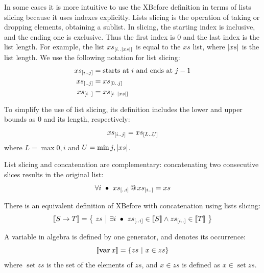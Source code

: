 \documentclass[12pt,openright,twoside,a4paper,oldfontcommands,english,brazil,final]{abntex2}
\makeatletter
\theoremstyle{theo}
\newcommand{\sliceright}[2]{\ensuremath #1_{\left[..#2\right]}}
\newcommand{\sliceleft}[2]{\ensuremath #1_{\left[#2..\right]}}
\newcommand{\slice}[3]{\ensuremath #1_{\left[#2..#3\right]}}
\def\varop{\ensuremath\operatorname{\mathbf{var}}}
\newcommand{\var}[1]{\ensuremath\varop #1}
\def\xbeforeop{\ensuremath\rightarrow}
\newcommand{\xbefore}[2]{\ensuremath #1 \xbeforeop #2 }
\newcommand{\length}[1]{\ensuremath\left|#1\right|}
\newcommand{\append}[2]{\ensuremath #1 \operatorname{\mathbf{@}} #2}
\newcommand{\denote}[1]{\ensuremath\left[\!\left[#1\right]\!\right]}
\makeatother
\begin{document}
In some cases it is more intuitive to use the \ac{XBefore} definition in terms of lists slicing because it uses indexes explicitly.
Lists slicing is the operation of taking or dropping elements, obtaining a sublist.
In slicing, the starting index is inclusive, and the ending one is exclusive.
Thus the first index is 0 and the last index is the list length.
For example, the list $\slice{xs}{i}{\length{xs}}$ is equal to the $xs$ list, where $\length{xs}$ is the list length.
We use the following notation for list slicing:
%
\begin{subequations}
\begin{align}
\slice{xs}{i}{j} &= \text{starts at $i$ and ends at $j-1$}\label{def:slice}\\
\sliceright{xs}{j} &= \slice{xs}{0}{j}\label{def:slice-right}\\
\sliceleft{xs}{i} &= \slice{xs}{i}{\length{xs}}\label{def:slice-left}
\end{align}
\end{subequations}

To simplify the use of list slicing, its definition includes the lower and upper bounds as $0$ and its length, respectively:
%
\begin{equation}
\slice{xs}{i}{j} = \slice{xs}{L}{U}
\end{equation}
%
where $L = \max{0,i}$ and $U = \min{j,\length{xs}}$.

List slicing and concatenation are complementary: concatenating two consecutive slices results in the original list:
\begin{equation}
\label{law:slice-append}
\forall i ~\bullet~ \append{\sliceright{xs}{i}}{\sliceleft{xs}{i}} = xs
\end{equation}

There is an equivalent definition of \ac{XBefore} with concatenation using lists slicing:
%
\begin{equation}
\label{def:xbefore-slice}
\denote{\xbefore{S}{T}} =
  \left\{~
    zs ~\middle|~ \exists i ~\bullet~ \sliceright{zs}{i} \in \denote{S} \land \sliceleft{zs}{i} \in \denote{T}
  ~\right\}
\end{equation}

A variable in \ac{algebra} is defined by one generator, and denotes its occurrence:
%
\begin{equation}
\label{def:var}
\denote{\var{x}} =
  \left\{
    zs ~\middle|~ x \in zs
  \right\}
\end{equation}
%
where $\mathop{set}zs$ is the set of the elements of $zs$, and $x \in zs$ is defined as $x \in \mathop{set} zs$.
\end{document}

